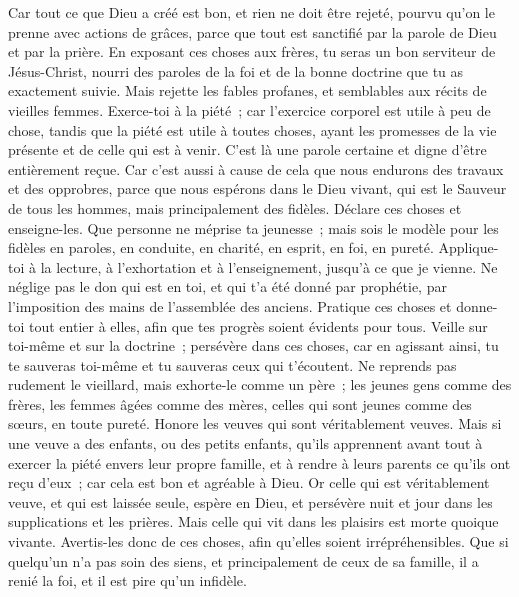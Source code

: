 \begin{multicols}{2}
Car tout ce que Dieu a créé est bon, et rien ne doit être rejeté, pourvu qu'on le prenne avec actions de grâces,
parce que tout est sanctifié par la parole de Dieu et par la prière.
En exposant ces choses aux frères, tu seras un bon serviteur de Jésus-Christ, nourri des paroles de la foi et de la bonne doctrine que tu as exactement suivie.
Mais rejette les fables profanes, et semblables aux récits de vieilles femmes.
Exerce-toi à la piété~; car l'exercice corporel est utile à peu de chose, tandis que la piété est utile à toutes choses, ayant les promesses de la vie présente et de celle qui est à venir.
C'est là une parole certaine et digne d'être entièrement reçue.
Car c'est aussi à cause de cela que nous endurons des travaux et des opprobres, parce que nous espérons dans le Dieu vivant, qui est le Sauveur de tous les hommes, mais principalement des fidèles.
Déclare ces choses et enseigne-les.
Que personne ne méprise ta jeunesse~; mais sois le modèle pour les fidèles en paroles, en conduite, en charité, en esprit, en foi, en pureté.
Applique-toi à la lecture, à l'exhortation et à l'enseignement, jusqu'à ce que je vienne.
Ne néglige pas le don qui est en toi, et qui t'a été donné par prophétie, par l'imposition des mains de l'assemblée des anciens.
Pratique ces choses et donne-toi tout entier à elles, afin que tes progrès soient évidents pour tous.
Veille sur toi-même et sur la doctrine~; persévère dans ces choses, car en agissant ainsi, tu te sauveras toi-même et tu sauveras ceux qui t'écoutent.
\VerseOne{}Ne reprends pas rudement le vieillard, mais exhorte-le comme un père~; les jeunes gens comme des frères,
les femmes âgées comme des mères, celles qui sont jeunes comme des sœurs, en toute pureté.
Honore les veuves qui sont véritablement veuves.
Mais si une veuve a des enfants, ou des petits enfants, qu'ils apprennent avant tout à exercer la piété envers leur propre famille, et à rendre à leurs parents ce qu'ils ont reçu d'eux~; car cela est bon et agréable à Dieu.
Or celle qui est véritablement veuve, et qui est laissée seule, espère en Dieu, et persévère nuit et jour dans les supplications et les prières.
Mais celle qui vit dans les plaisirs est morte quoique vivante.
Avertis-les donc de ces choses, afin qu'elles soient irrépréhensibles.
Que si quelqu'un n'a pas soin des siens, et principalement de ceux de sa famille, il a renié la foi, et il est pire qu'un infidèle.

\end{multicols}
